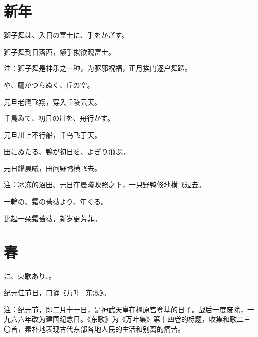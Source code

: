 \section{\FK 新年}

\setcounter{haikucounter}{0}

\begin{haiku}
    {\FH 獅子舞は、入日の富士に、手をかざす。}

    {\FK 狮子舞到日落西，额手拟欲观富士。}

    {\FT 注：狮子舞是神乐之一种，为驱邪祝福，正月挨门逐户舞蹈。}
\end{haiku}

\begin{haiku}
    {\FH {}や、鷹がつらぬく、丘の空。}

    {\FK 元旦老鹰飞翔，穿入丘陵云天。}
\end{haiku}

\begin{haiku}
    {\FH 千鳥ゐて、初日の川を、舟行かず。}

    {\FK 元旦川上不行船，千鸟飞于天。}
\end{haiku}

\begin{haiku}
    {\FH 田にゐたる、鴨が初日を、よぎり飛ぶ。}

    {\FK 元日耀晨曦，田间野鸭横飞去。}

    {\FT 注：冰冻的沼田、元日在晨曦映照之下，一只野鸭倏地横飞过去。}
\end{haiku}

\begin{haiku}
    {\FH 一輪の、霜の薔薇より、年くる。}

    {\FK 比起一朵霜蔷薇，新岁更芳菲。}
\end{haiku}

\section{\FK 春}

\setcounter{haikucounter}{0}

\begin{haiku}
    {\FH {}に、東歌あり、。}

    {\FK 纪元佳节日，口诵《万叶·东歌》。}

    {\FT 注：纪元节，即二月十一日，是神武天皇在橿原宫登基的日子。战后一度废除，一九六六年改为建国纪念日。《东歌》为《万叶集》第十四卷的标题，收集和歌二三〇首，素朴地表现古代东部各地人民的生活和别离的痛苦。}
\end{haiku}

